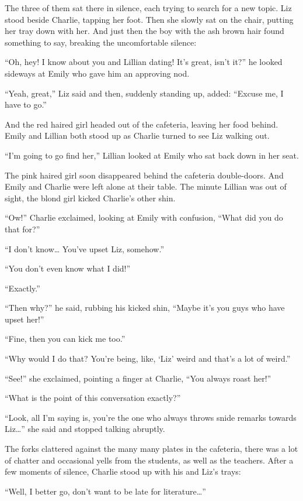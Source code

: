 The three of them sat there in silence, each trying to search for a new topic. Liz stood beside Charlie, tapping her foot. Then she slowly sat on the chair, putting her tray down with her. And just then the boy with the ash brown hair found something to say, breaking the uncomfortable silence:

“Oh, hey! I know about you and Lillian dating! It’s great, isn’t it?” he looked sideways at Emily who gave him an approving nod.

“Yeah, great,” Liz said and then, suddenly standing up, added: “Excuse me, I have to go.”

And the red haired girl headed out of the cafeteria, leaving her food behind. Emily and Lillian both stood up as Charlie turned to see Liz walking out.

“I’m going to go find her,” Lillian looked at Emily who sat back down in her seat.

The pink haired girl soon disappeared behind the cafeteria double-doors. And Emily and Charlie were left alone at their table. The minute Lillian was out of sight, the blond girl kicked Charlie’s other shin.

“Ow!” Charlie exclaimed, looking at Emily with confusion, “What did you do that for?”

“I don’t know… You’ve upset Liz, somehow.”

“You don’t even know what I did!”

“Exactly.”

“Then why?” he said, rubbing his kicked shin, “Maybe it’s you guys who have upset her!”

“Fine, then you can kick me too.”

“Why would I do that? You’re being, like, ‘Liz’ weird and that’s a lot of weird.”

“See!” she exclaimed, pointing a finger at Charlie, “You always roast her!”

“What is the point of this conversation exactly?”

“Look, all I’m saying is, you’re the one who always throws snide remarks towards Liz…” she said and stopped talking abruptly.

The forks clattered against the many many plates in the cafeteria, there was a lot of chatter and occasional yells from the students, as well as the teachers. After a few moments of silence, Charlie stood up with his and Liz’s trays:

“Well, I better go, don’t want to be late for literature…”

